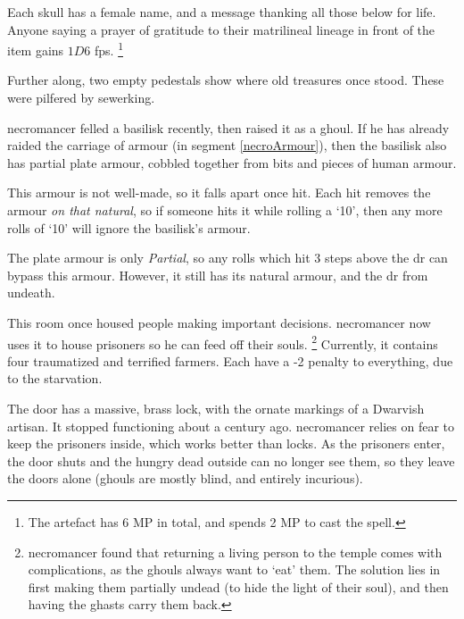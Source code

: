 \begin{multicols}{2}
Each skull has a female name, and a message thanking all those below for life.
Anyone saying a prayer of gratitude to their matrilineal lineage in front of the item gains $1D6$ \glspl{fp}.%
\footnote{The \gls{artefact} has 6 MP in total, and spends 2 MP to cast the spell.}

Further along, two empty pedestals show where old treasures once stood.
These were pilfered by \gls{sewerking}.%


\Gls{necromancer} felled a basilisk recently, then raised it as a ghoul.
If he has already raided the carriage of armour (in \gls{segment} \vref{necroArmour}), then the basilisk also has partial plate armour, cobbled together from bits and pieces of human armour.

This armour is not well-made, so it falls apart once hit.
Each hit removes the armour \textit{on that \gls{natural}}, so if someone hits it while rolling a `10', then any more rolls of `10' will ignore the basilisk's armour.

The plate armour is only \textit{Partial}, so any rolls which hit 3 steps above the \gls{dr} can bypass this armour.
However, it still has its natural armour, and the \gls{dr} from undeath.%

\undeadBasilisk



This room once housed people making important decisions.
\Gls{necromancer} now uses it to house prisoners so he can feed off their souls.%
\footnote{\Gls{necromancer} found that returning a living person to the temple comes with complications, as the ghouls always want to `eat' them.
The solution lies in first making them partially undead (to hide the light of their soul), and then having the ghasts carry them back.}
Currently, it contains four traumatized and terrified farmers.
Each have a -2 penalty to everything, due to the starvation.

The door has a massive, brass lock, with the ornate markings of a Dwarvish artisan.
It stopped functioning about a century ago.
\Gls{necromancer} relies on fear to keep the prisoners inside, which works better than locks.
As the prisoners enter, the door shuts and the hungry dead outside can no longer see them, so they leave the doors alone (ghouls are mostly blind, and entirely incurious).


\end{multicols}
